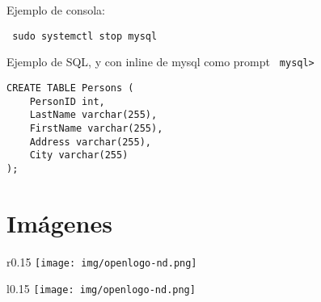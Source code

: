 \documentclass[12pt,a4paper,openany]{book}
\begin{document}
Ejemplo de consola: 	
\begin{verbatim}
 sudo systemctl stop mysql
\end{verbatim}

Ejemplo de SQL, y con inline de mysql como prompt \texttt{ mysql> }



\begin{tcolorbox}[arc=3mm,colback=solarizeddark,title=My heading line]
	\begin{verbatim}
CREATE TABLE Persons (
    PersonID int,
    LastName varchar(255),
    FirstName varchar(255),
    Address varchar(255),
    City varchar(255)
);
	\end{verbatim}
\end{tcolorbox}


%
%



\section{Imágenes}
\begin{wrapfigure}{r}{0.15\textwidth} %
    \centering %
    \vspace{-10pt} %
    \texttt{[image: img/openlogo-nd.png]}
\end{wrapfigure}\Blindtext[1]


\begin{wrapfigure}{l}{0.15\textwidth} %
    \centering
    \texttt{[image: img/openlogo-nd.png]}
\end{wrapfigure}\Blindtext[1]
\end{document}
